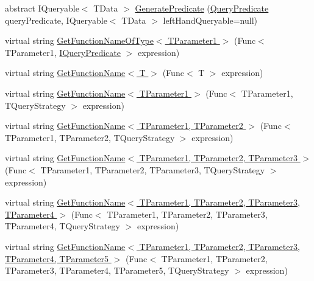 \begin{DoxyCompactItemize}
\item 
abstract I\+Queryable$<$ T\+Data $>$ \hyperlink{classCqrs_1_1Repositories_1_1Queries_1_1QueryBuilder_aa38989a8b4808c7c73e7cf038b535ea7_aa38989a8b4808c7c73e7cf038b535ea7}{Generate\+Predicate} (\hyperlink{classCqrs_1_1Repositories_1_1Queries_1_1QueryPredicate}{Query\+Predicate} query\+Predicate, I\+Queryable$<$ T\+Data $>$ left\+Hand\+Queryable=null)
\item 
virtual string \hyperlink{classCqrs_1_1Repositories_1_1Queries_1_1QueryBuilder_a09b5db1f6e86d02c04f132080e88aa38_a09b5db1f6e86d02c04f132080e88aa38}{Get\+Function\+Name\+Of\+Type$<$ T\+Parameter1 $>$} (Func$<$ T\+Parameter1, \hyperlink{interfaceCqrs_1_1Repositories_1_1Queries_1_1IQueryPredicate}{I\+Query\+Predicate} $>$ expression)
\item 
virtual string \hyperlink{classCqrs_1_1Repositories_1_1Queries_1_1QueryBuilder_a2fce57b724f5443ea75e2f17ae07d401_a2fce57b724f5443ea75e2f17ae07d401}{Get\+Function\+Name$<$ T $>$} (Func$<$ T $>$ expression)
\item 
virtual string \hyperlink{classCqrs_1_1Repositories_1_1Queries_1_1QueryBuilder_ace3bdd5bf69a3d56f2e1ec19e75bf2cf_ace3bdd5bf69a3d56f2e1ec19e75bf2cf}{Get\+Function\+Name$<$ T\+Parameter1 $>$} (Func$<$ T\+Parameter1, T\+Query\+Strategy $>$ expression)
\item 
virtual string \hyperlink{classCqrs_1_1Repositories_1_1Queries_1_1QueryBuilder_a45c4e9123301de6f5b3cdd41c79e86ab_a45c4e9123301de6f5b3cdd41c79e86ab}{Get\+Function\+Name$<$ T\+Parameter1, T\+Parameter2 $>$} (Func$<$ T\+Parameter1, T\+Parameter2, T\+Query\+Strategy $>$ expression)
\item 
virtual string \hyperlink{classCqrs_1_1Repositories_1_1Queries_1_1QueryBuilder_a8fbbbe8bd1f48413c862668799987dec_a8fbbbe8bd1f48413c862668799987dec}{Get\+Function\+Name$<$ T\+Parameter1, T\+Parameter2, T\+Parameter3 $>$} (Func$<$ T\+Parameter1, T\+Parameter2, T\+Parameter3, T\+Query\+Strategy $>$ expression)
\item 
virtual string \hyperlink{classCqrs_1_1Repositories_1_1Queries_1_1QueryBuilder_aebcd9642f5cab863707bcfc2b4ad8b54_aebcd9642f5cab863707bcfc2b4ad8b54}{Get\+Function\+Name$<$ T\+Parameter1, T\+Parameter2, T\+Parameter3, T\+Parameter4 $>$} (Func$<$ T\+Parameter1, T\+Parameter2, T\+Parameter3, T\+Parameter4, T\+Query\+Strategy $>$ expression)
\item 
virtual string \hyperlink{classCqrs_1_1Repositories_1_1Queries_1_1QueryBuilder_a0228422245afb7fe388114236bb1aefa_a0228422245afb7fe388114236bb1aefa}{Get\+Function\+Name$<$ T\+Parameter1, T\+Parameter2, T\+Parameter3, T\+Parameter4, T\+Parameter5 $>$} (Func$<$ T\+Parameter1, T\+Parameter2, T\+Parameter3, T\+Parameter4, T\+Parameter5, T\+Query\+Strategy $>$ expression)

\end{DoxyCompactItemize}
